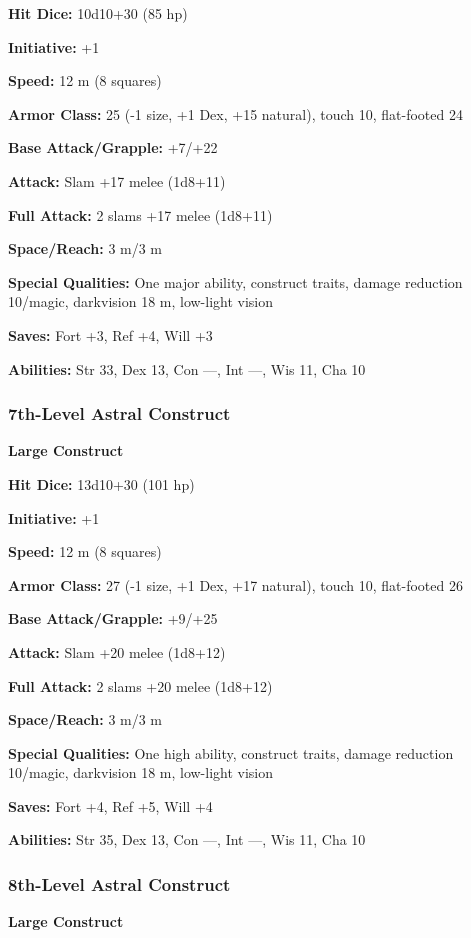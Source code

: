 {\begin{MonsterMiniStats}
	\textbf{Hit Dice:} 10d10+30 (85 hp)

	\textbf{Initiative:} +1

	\textbf{Speed:} 12 m (8 squares)

	\textbf{Armor Class:} 25 (-1 size, +1 Dex, +15 natural), touch 10, flat-footed 24

	\textbf{Base Attack/Grapple:} +7/+22

	\textbf{Attack:} Slam +17 melee (1d8+11)

	\textbf{Full Attack:} 2 slams +17 melee (1d8+11)

	\textbf{Space/Reach:} 3 m/3 m

	\textbf{Special Qualities:} One major ability, construct traits, damage reduction 10/magic, darkvision 18 m, low-light vision

	\textbf{Saves:} Fort +3, Ref +4, Will +3

	\textbf{Abilities:} Str 33, Dex 13, Con ---, Int ---, Wis 11, Cha 10
	\end{MonsterMiniStats}

\subsubsection{7th-Level Astral Construct}
	\begin{MonsterMiniStats}
	\textbf{Large Construct}

	\textbf{Hit Dice:} 13d10+30 (101 hp)

	\textbf{Initiative:} +1

	\textbf{Speed:} 12 m (8 squares)

	\textbf{Armor Class:} 27 (-1 size, +1 Dex, +17 natural), touch 10, flat-footed 26

	\textbf{Base Attack/Grapple:} +9/+25

	\textbf{Attack:} Slam +20 melee (1d8+12)

	\textbf{Full Attack:} 2 slams +20 melee (1d8+12)

	\textbf{Space/Reach:} 3 m/3 m

	\textbf{Special Qualities:} One high ability, construct traits, damage reduction 10/magic, darkvision 18 m, low-light vision

	\textbf{Saves:} Fort +4, Ref +5, Will +4

	\textbf{Abilities:} Str 35, Dex 13, Con ---, Int ---, Wis 11, Cha 10
	\end{MonsterMiniStats}

\subsubsection{8th-Level Astral Construct}
	\begin{MonsterMiniStats}
	\textbf{Large Construct}


\end{MonsterMiniStats}}
